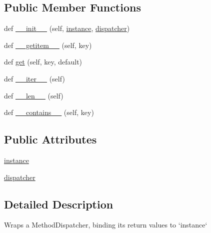 \subsection*{Public Member Functions}
\begin{DoxyCompactItemize}
\item 
def \hyperlink{classpip_1_1__vendor_1_1html5lib_1_1__utils_1_1BoundMethodDispatcher_a596f6d3b2914a5fb4cadd56df8594ae0}{\+\_\+\+\_\+init\+\_\+\+\_\+} (self, \hyperlink{classpip_1_1__vendor_1_1html5lib_1_1__utils_1_1BoundMethodDispatcher_ae216cf959a5f37380056d0d00103ac53}{instance}, \hyperlink{classpip_1_1__vendor_1_1html5lib_1_1__utils_1_1BoundMethodDispatcher_a9351bf81ff40d3ef5dab2f4f0d971531}{dispatcher})
\item 
def \hyperlink{classpip_1_1__vendor_1_1html5lib_1_1__utils_1_1BoundMethodDispatcher_ad95a8e95356318497cd127bc1985ba79}{\+\_\+\+\_\+getitem\+\_\+\+\_\+} (self, key)
\item 
def \hyperlink{classpip_1_1__vendor_1_1html5lib_1_1__utils_1_1BoundMethodDispatcher_a00c5ddaa9ea9f45725e4700f977a831f}{get} (self, key, default)
\item 
def \hyperlink{classpip_1_1__vendor_1_1html5lib_1_1__utils_1_1BoundMethodDispatcher_a2b757ded110b271e3acc2e2e7b19f67d}{\+\_\+\+\_\+iter\+\_\+\+\_\+} (self)
\item 
def \hyperlink{classpip_1_1__vendor_1_1html5lib_1_1__utils_1_1BoundMethodDispatcher_a0aa9557b38de609107a18bd57c9c4275}{\+\_\+\+\_\+len\+\_\+\+\_\+} (self)
\item 
def \hyperlink{classpip_1_1__vendor_1_1html5lib_1_1__utils_1_1BoundMethodDispatcher_aea8d480654017c22d7997c0d574a773f}{\+\_\+\+\_\+contains\+\_\+\+\_\+} (self, key)
\end{DoxyCompactItemize}
\subsection*{Public Attributes}
\begin{DoxyCompactItemize}
\item 
\hyperlink{classpip_1_1__vendor_1_1html5lib_1_1__utils_1_1BoundMethodDispatcher_ae216cf959a5f37380056d0d00103ac53}{instance}
\item 
\hyperlink{classpip_1_1__vendor_1_1html5lib_1_1__utils_1_1BoundMethodDispatcher_a9351bf81ff40d3ef5dab2f4f0d971531}{dispatcher}
\end{DoxyCompactItemize}


\subsection{Detailed Description}
\begin{DoxyVerb}Wraps a MethodDispatcher, binding its return values to `instance`\end{DoxyVerb}
 


